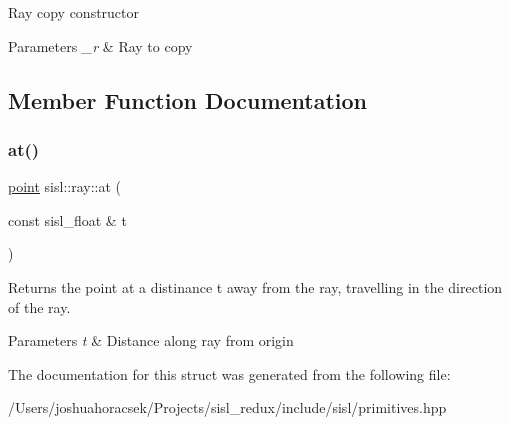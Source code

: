 Ray copy constructor 
\begin{DoxyParams}{Parameters}
{\em \+\_\+r} & Ray to copy \\
\hline
\end{DoxyParams}


\subsection{Member Function Documentation}
\mbox{\label{structsisl_1_1ray_ae32b430c114c83d70ffa2a091ee6c753}} 
\subsubsection{\texorpdfstring{at()}{at()}}
{\footnotesize\ttfamily \hyperlink{namespacesisl_afaf80b1234035c1dbd3d570c96c6a63a}{point} sisl\+::ray\+::at (\begin{DoxyParamCaption}\item[{const sisl\+\_\+float \&}]{t }\end{DoxyParamCaption})\hspace{0.3cm}{\ttfamily [inline]}}

Returns the point at a distinance t away from the ray, travelling in the direction of the ray. 
\begin{DoxyParams}{Parameters}
{\em t} & Distance along ray from origin \\
\hline
\end{DoxyParams}


The documentation for this struct was generated from the following file\+:\begin{DoxyCompactItemize}
\item 
/\+Users/joshuahoracsek/\+Projects/sisl\+\_\+redux/include/sisl/primitives.\+hpp\end{DoxyCompactItemize}
